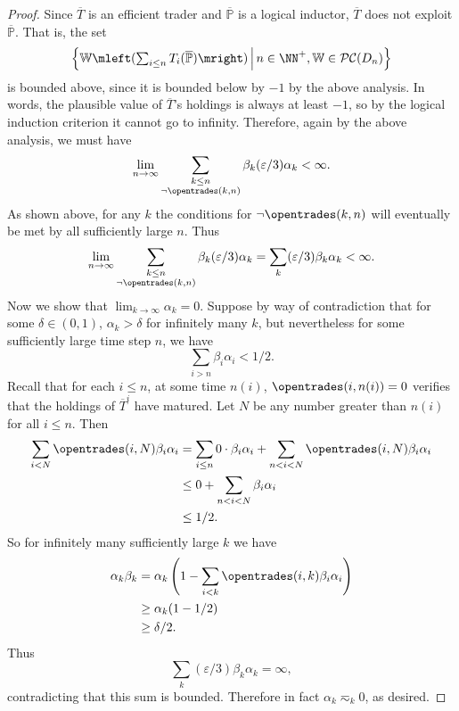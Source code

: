 \documentclass[authordate,onecolumn,noenvironments]{miri-tech-article}
\numberwithin{equation}{subsection}
\newcommand{\seq}[1]{{\overline{#1}}}
\newcommand{\nn}{n}
\newcommand{\li}{logical inductor}
\newcommand{\lic}{logical induction criterion}
\newcommand{\trade}{T}%
\newcommand{\Trader}{\seq{\trade}} %
\newcommand{\BelState}{\mathbb{P}}
\newcommand{\pt}{\BelState}
\newcommand{\MP}{\seq{\pt}}
\newcommand{\dt}{D}
\newcommand{\pcworlds}{\mathcal{P\-C}}
\newcommand{\World}{\mathbb{W}}
\begin{document}
\begin{proof}
Since $\Trader$ is an efficient trader and $\MP$ is a \li{}, $\Trader$ does not exploit $\MP$. That is, the set 
%
\[    \left\{ \World\mleft({\textstyle \sum_{i \leq n} \trade_i} (\MP) \mright) \,\middle|\, \nn\in\NN^+, \World\in\pcworlds(\dt_\nn)
\right\} \]
%
is bounded above, since it is bounded below by $-1$ by the above analysis. In words, the plausible 
value of $\Trader$'s holdings is always at least $-1$, so by the \lic{} it
cannot go to infinity. Therefore, again by the above analysis,  we must have  
%
\[ \lim_{n \to\infty} \sum_{\substack{k\leq n\\ \lnot\opentrades(k,n)}}  \beta_k (\varepsilon/3) \alpha_k <\infty. \]
%
As shown above,
for any $k$ the conditions for $\lnot\opentrades(k,n)$ will eventually be met by all sufficiently large $n$. Thus 
%
\[ \lim_{n \to\infty} \sum_{\substack{k\leq n\\ \lnot\opentrades(k,n)}}  \beta_k (\varepsilon/3) \alpha_k = 
\sum_{k}  (\varepsilon/3) \beta_k \alpha_k <\infty.\]
%
Now we show that $\lim_{k \to\infty} \alpha_k = 0$. 
Suppose by way of contradiction that for some $\delta \in (0, 1)$, $\alpha_k > \delta$ for infinitely many $k$, but nevertheless for some sufficiently large time
step $n$, we have
%
\[ \sum_{i>n} \beta_i \alpha_i < 1/2. \]
%
Recall that  for each $i\leq n$, at some time $n(i)$, $\opentrades(i,n(i)) =0$ verifies that the holdings of $\Trader^i$ have matured.
 Let $N$ be any number greater than $n(i)$ for all $i \leq n$. Then 
%
\begin{align*}
\sum_{i < N} \opentrades(i,N) \beta_i \alpha_i
& = \sum_{i \leq n}0 \cdot \beta_i \alpha_i + \sum_{n<i < N} \opentrades(i,N) \beta_i \alpha_i\\
& \leq 0 + \sum_{n<i < N} \beta_i \alpha_i\\
& \leq 1/2. 
\end{align*}
%
So for infinitely many sufficiently large $k$ we have 
%
\begin{align*}
  \alpha_k \beta_k 
  &= \alpha_k \left(1- \sum_{i < k} \opentrades(i,k) \beta_i \alpha_i \right) \\
  &\geq \alpha_k (1 - 1/2) \\
  &\geq \delta/2. 
\end{align*}
%
Thus
%
\[ \sum_k (\varepsilon/3) \beta_k \alpha_k =\infty, \]
%
contradicting that this sum is bounded. 
Therefore in fact $\alpha_k \eqsim_k 0$, as desired.
\end{proof}



\end{document}
